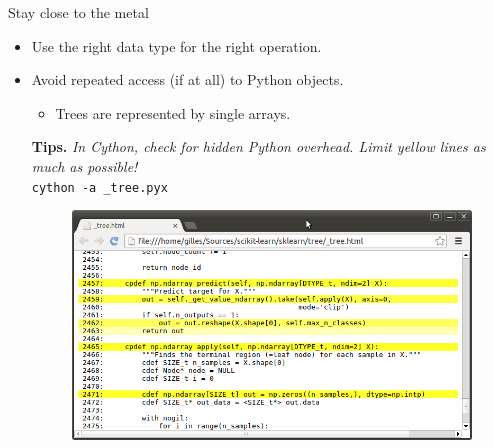 \documentclass{beamer}
\begin{document}
\begin{frame}[fragile]{Stay close to the metal}


\begin{itemize}
\item Use the right data type for the right operation.
\item Avoid repeated access (if at all) to Python objects.
  \begin{itemize}
    \item Trees are represented by single arrays.
  \end{itemize}
  {\bf Tips.} \textit{In Cython, check for hidden Python overhead. Limit yellow lines as much as possible!}\\
  \texttt{cython -a \_tree.pyx}
  \begin{figure}
  \includegraphics[scale=0.3]{./figures/cython.png}
  \end{figure}
\end{itemize}


\end{frame}
\end{document}
